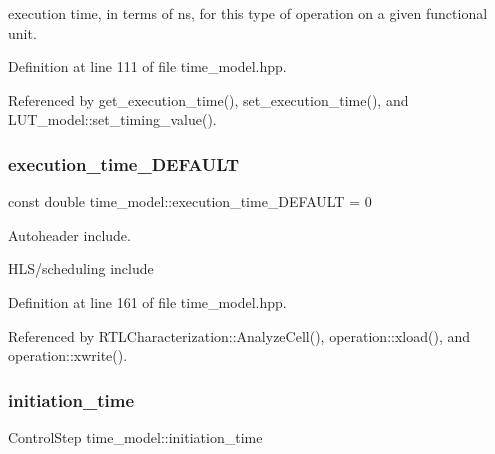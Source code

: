 execution time, in terms of ns, for this type of operation on a given functional unit. 



Definition at line 111 of file time\+\_\+model.\+hpp.



Referenced by get\+\_\+execution\+\_\+time(), set\+\_\+execution\+\_\+time(), and L\+U\+T\+\_\+model\+::set\+\_\+timing\+\_\+value().

\mbox{\label{classtime__model_a36ea9e8031fda2f9282c8062a647d5c6}} 
\subsubsection{\texorpdfstring{execution\+\_\+time\+\_\+\+D\+E\+F\+A\+U\+LT}{execution\_time\_DEFAULT}}
{\footnotesize\ttfamily const double time\+\_\+model\+::execution\+\_\+time\+\_\+\+D\+E\+F\+A\+U\+LT = 0\hspace{0.3cm}{\ttfamily [static]}}



Autoheader include. 

H\+L\+S/scheduling include 

Definition at line 161 of file time\+\_\+model.\+hpp.



Referenced by R\+T\+L\+Characterization\+::\+Analyze\+Cell(), operation\+::xload(), and operation\+::xwrite().

\mbox{\label{classtime__model_a2bee5d1ff834d4b990970a48971c31a2}} 
\subsubsection{\texorpdfstring{initiation\+\_\+time}{initiation\_time}}
{\footnotesize\ttfamily Control\+Step time\+\_\+model\+::initiation\+\_\+time\hspace{0.3cm}{\ttfamily [protected]}}



